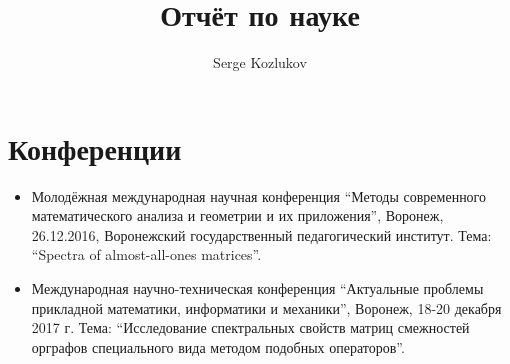 \documentclass[a4paper]{article}
\title{Отчёт по науке}
\author{Serge Kozlukov}
\begin{document}
\maketitle

\section*{Конференции}
\begin{itemize}
\item
    Молодёжная международная научная конференция
    ``Методы современного математического анализа и геометрии и их приложения'',
    Воронеж,
    26.12.2016,
    Воронежский государственный педагогический институт.
    Тема: ``Spectra of almost-all-ones matrices''.
\item 
    Международная научно-техническая конференция
    ``Актуальные проблемы прикладной
    математики, информатики и механики'',
    Воронеж,
    18-20 декабря 2017 г.
    Тема: ``Исследование спектральных свойств матриц смежностей орграфов специального вида методом подобных операторов''.
\end{itemize}

\nocite{*}
\printbibliography
\end{document}
